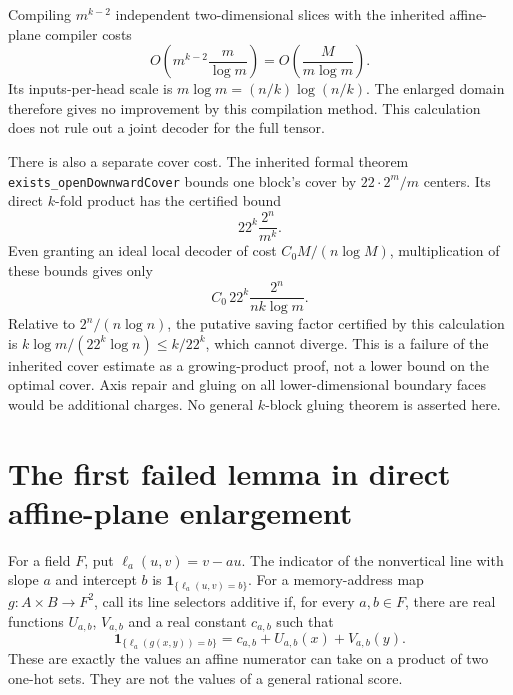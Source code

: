 \documentclass[11pt]{article}
\begin{document}
Compiling $m^{k-2}$ independent two-dimensional slices with the inherited
affine-plane compiler costs
\[
 O\left(m^{k-2}\frac m{\log m}\right)
 =O\left(\frac{M}{m\log m}\right).
\]
Its inputs-per-head scale is $m\log m=(n/k)\log(n/k)$. The enlarged
domain therefore gives no improvement by this compilation method. This
calculation does not rule out a joint decoder for the full tensor.

There is also a separate cover cost. The inherited formal theorem
\texttt{exists\_openDownwardCover} bounds one block's cover by
$22\cdot2^m/m$ centers. Its direct $k$-fold product has the certified bound
\[
 22^k\frac{2^n}{m^k}.
\]
Even granting an ideal local decoder of cost
$C_0M/(n\log M)$, multiplication of these bounds gives only
\[
 C_0\,22^k\frac{2^n}{n k\log m}.
\]
Relative to $2^n/(n\log n)$, the putative saving factor certified by this
calculation is $k\log m/(22^k\log n)\leq k/22^k$, which cannot diverge.
This is a failure of the inherited cover estimate as a growing-product
proof, not a lower bound on the optimal cover. Axis repair and gluing on
all lower-dimensional boundary faces would be additional charges. No
general $k$-block gluing theorem is asserted here.

\section{The first failed lemma in direct affine-plane enlargement}

For a field $F$, put
$\ell_a(u,v)=v-au$. The indicator of the nonvertical line with slope
$a$ and intercept $b$ is $\mathbf1_{\{\ell_a(u,v)=b\}}$.
For a memory-address map $g:A\times B\to F^2$, call its line selectors
additive if, for every $a,b\in F$, there are real functions $U_{a,b}$,
$V_{a,b}$ and a real constant $c_{a,b}$ such that
\[
 \mathbf1_{\{\ell_a(g(x,y))=b\}}
 =c_{a,b}+U_{a,b}(x)+V_{a,b}(y).
 \tag{1}
\]
These are exactly the values an affine numerator can take on a product
of two one-hot sets. They are not the values of a general rational score.
\end{document}
